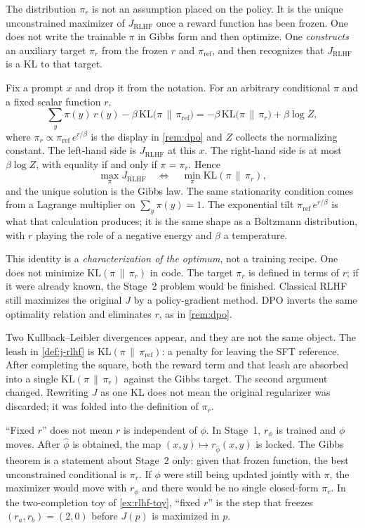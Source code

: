\documentclass[11pt,a4paper]{article}
\theoremstyle{definition}
\begin{document}
\begin{remark}\label{rem:dpo-gibbs}
The distribution $\pi_r$ is not an assumption placed on the policy. It is the
unique unconstrained maximizer of $J_{\mathrm{RLHF}}$ once a reward function has
been frozen. One does not write the trainable $\pi$ in Gibbs form and then
optimize. One \emph{constructs} an auxiliary target $\pi_r$ from the frozen $r$
and $\pi_{\mathrm{ref}}$, and then recognizes that $J_{\mathrm{RLHF}}$ is a KL
to that target.

Fix a prompt $x$ and drop it from the notation. For an arbitrary conditional
$\pi$ and a fixed scalar function $r$,
\[
\sum_y\pi(y)\,r(y)
-\beta\,\mathrm{KL}\bigl(\pi\,\|\,\pi_{\mathrm{ref}}\bigr)
=
-\beta\,\mathrm{KL}\bigl(\pi\,\|\,\pi_r\bigr)
+\beta\log Z,
\]
where $\pi_r\propto\pi_{\mathrm{ref}}\,e^{r/\beta}$ is the display in
\cref{rem:dpo} and $Z$ collects the normalizing constant. The left-hand side is
$J_{\mathrm{RLHF}}$ at this $x$. The right-hand side is at most $\beta\log Z$,
with equality if and only if $\pi=\pi_r$. Hence
\[
\max_\pi J_{\mathrm{RLHF}}
\quad\Longleftrightarrow\quad
\min_\pi\mathrm{KL}(\pi\,\|\,\pi_r),
\]
and the unique solution is the Gibbs law. The same stationarity condition comes
from a Lagrange multiplier on $\sum_y\pi(y)=1$. The exponential tilt
$\pi_{\mathrm{ref}}\,e^{r/\beta}$ is what that calculation produces; it is the
same shape as a Boltzmann distribution, with $r$ playing the role of a negative
energy and $\beta$ a temperature.

This identity is a \emph{characterization of the optimum}, not a training recipe.
One does not minimize $\mathrm{KL}(\pi\,\|\,\pi_r)$ in code. The target $\pi_r$
is defined in terms of $r$; if it were already known, the Stage~2 problem would
be finished. Classical RLHF still maximizes the original $J$ by a
policy-gradient method. DPO inverts the same optimality relation and eliminates
$r$, as in \cref{rem:dpo}.

Two Kullback--Leibler divergences appear, and they are not the same object. The
leash in \cref{def:j-rlhf} is $\mathrm{KL}(\pi\,\|\,\pi_{\mathrm{ref}})$: a
penalty for leaving the SFT reference. After completing the square, both the
reward term and that leash are absorbed into a single
$\mathrm{KL}(\pi\,\|\,\pi_r)$ against the Gibbs target. The second argument
changed. Rewriting $J$ as one KL does not mean the original regularizer was
discarded; it was folded into the definition of $\pi_r$.

``Fixed $r$'' does not mean $r$ is independent of $\phi$. In Stage~1, $r_\phi$
is trained and $\phi$ moves. After $\widehat\phi$ is obtained, the map
$(x,y)\mapsto r_{\widehat\phi}(x,y)$ is locked. The Gibbs theorem is a statement
about Stage~2 only: given that frozen function, the best unconstrained
conditional is $\pi_r$. If $\phi$ were still being updated jointly with $\pi$,
the maximizer would move with $r_\phi$ and there would be no single closed-form
$\pi_r$. In the two-completion toy of \cref{ex:rlhf-toy}, ``fixed $r$'' is the
step that freezes $(r_a,r_b)=(2,0)$ before $J(p)$ is maximized in $p$.


\end{remark}
\end{document}
